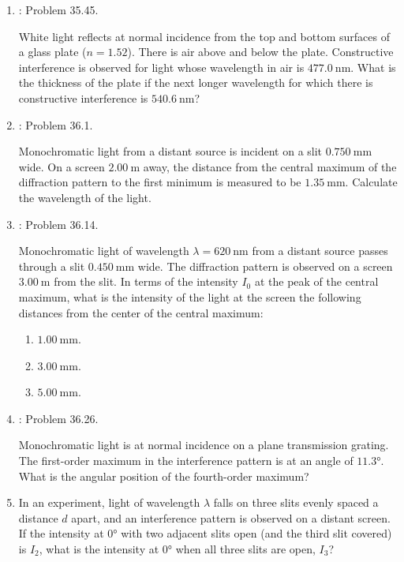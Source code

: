\documentclass[../psets.tex]{subfiles}
\begin{document}
\begin{enumerate}[label={\arabic*)}]
\begin{center}
    \end{center}
    \item \textcite{bib:YoungFreedman}: Problem 35.45.\par
    White light reflects at normal incidence from the top and bottom surfaces of a glass plate ($n=1.52$). There is air above and below the plate. Constructive interference is observed for light whose wavelength in air is $\SI{477.0}{\nano\meter}$. What is the thickness of the plate if the next longer wavelength for which there is constructive interference is $\SI{540.6}{\nano\meter}$?
    \item \textcite{bib:YoungFreedman}: Problem 36.1.\par
    Monochromatic light from a distant source is incident on a slit $\SI{0.750}{\milli\meter}$ wide. On a screen $\SI{2.00}{\meter}$ away, the distance from the central maximum of the diffraction pattern to the first minimum is measured to be $\SI{1.35}{\milli\meter}$. Calculate the wavelength of the light.
    \pagebreak
    \item \textcite{bib:YoungFreedman}: Problem 36.14.\par
    Monochromatic light of wavelength $\lambda=\SI{620}{\nano\meter}$ from a distant source passes through a slit $\SI{0.450}{\milli\meter}$ wide. The diffraction pattern is observed on a screen $\SI{3.00}{\meter}$ from the slit. In terms of the intensity $I_0$ at the peak of the central maximum, what is the intensity of the light at the screen the following distances from the center of the central maximum:
    \begin{enumerate}
        \item $\SI{1.00}{\milli\meter}$.
        \item $\SI{3.00}{\milli\meter}$.
        \item $\SI{5.00}{\milli\meter}$.
    \end{enumerate}
    \item \textcite{bib:YoungFreedman}: Problem 36.26.\par
    Monochromatic light is at normal incidence on a plane transmission grating. The first-order maximum in the interference pattern is at an angle of $\ang{11.3}$. What is the angular position of the fourth-order maximum?
    \item In an experiment, light of wavelength $\lambda$ falls on three slits evenly spaced a distance $d$ apart, and an interference pattern is observed on a distant screen. If the intensity at $\ang{0}$ with two adjacent slits open (and the third slit covered) is $I_2$, what is the intensity at $\ang{0}$ when all three slits are open, $I_3$?
\end{enumerate}
\end{document}
